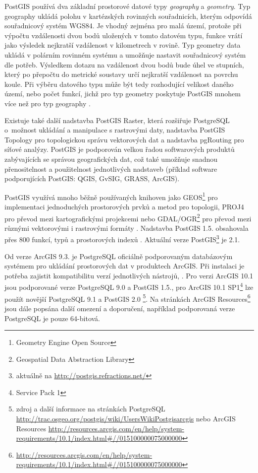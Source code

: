 PostGIS používá dva základní prostorové datové typy {\it geography} a {\it geometry}. Typ geography ukládá polohu v kartézských rovinných souřadnicích, kterým odpovídá souřadnicový systém WGS84. Je vhodný zejména pro malá území, protože při výpočtu vzdálenosti dvou bodů uložených v tomto datovém typu, funkce vrátí jako výsledek nejkratší vzdálenost v kilometrech v rovině. Typ geometry data ukládá v polárním rovinném systému a umožňuje nastavit souřadnicový systém dle potřeb. Výsledkem dotazu na vzdálenost dvou bodů bude úhel ve stupních, který po přepočtu do metrické soustavy určí nejkratší vzdálenost na povrchu koule. Při výběru datového typu může být tedy rozhodující velikost daného území, nebo počet funkcí, jichž pro typ geometry poskytuje PostGIS mnohem více než pro typ geography \citep{OpenGeo2012}.

Existuje také další nadstavba PostGIS Raster, která rozšiřuje PostgreSQL o~možnost ukládání a manipulace s rastrovými daty, nadstavba PostGIS Topology pro topologickou správu vektorových dat a nadstavba pgRouting pro síťové analýzy. PostGIS je podporován velkou řadou softwarových produktů zabývajících se správou geo\-gra\-fic\-kých dat, což také umožňuje snadnou přenositelnost a použitelnost jednotlivých nadstaveb (příklad software podporujících PostGIS: QGIS, GvSIG, GRASS, ArcGIS).

PostGIS využívá mnoho běžně používaných knihoven jako GEOS\footnote{Geometry Engine Open Source} pro implementaci jednoduchých prostorových prvků a metod pro topologii, PROJ4 pro převod mezi kartografickými projekcemi nebo GDAL/OGR\footnote{Geospatial Data Abstraction Library} pro převod mezi různými vektorovými i rastrovými formáty \citep{ObeHsu2011}. Nadstavba PostGIS 1.5. obsahovala přes 800 funkcí, typů a prostorových indexů \citep{ObeHsu2012}. Aktuální verze PostGIS\footnote{aktuálně na \url{http://postgis.refractions.net/}} je 2.1.

Od verze ArcGIS 9.3. je PostgreSQL oficiálně podporovaným databázovým systémem pro ukládání prostorových dat v produktech ArcGIS. Při instalaci je potřeba zajistit kompatibilitu verzí jednotlivých nástrojů, . Pro verzi ArcGIS 10.1 jsou podporované verze PostgreSQL 9.0 a PostGIS 1.5., pro ArcGIS 10.1 SP1\footnote{Service Pack 1} lze použít novější PostgreSQL 9.1 a PostGIS 2.0 \citep{OSGEO2013}\footnote{zdroj a další informace na stránkách PostgreSQL \url{http://trac.osgeo.org/postgis/wiki/UsersWikiPostgisarcgis} nebo ArcGIS Resources \url{http://resources.arcgis.com/en/help/system-requirements/10.1/index.html\#//015100000075000000}}. Na stránkách ArcGIS Resources\footnote{\url{http://resources.arcgis.com/en/help/system-requirements/10.1/index.html\#//015100000075000000}} jsou dále popsána další omezení a doporučení, například podporovaná verze PostgreSQL je pouze 64-bitová. 

